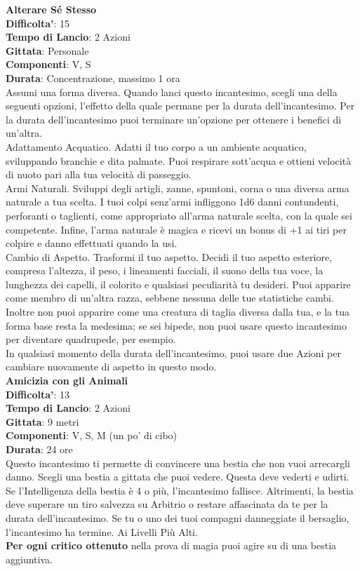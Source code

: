 \begin{multicols}{2}
\medskip\textbf{Alterare Sé Stesso}\\
\textbf{Difficolta'}: 15\\
\textbf{Tempo di Lancio}: 2 Azioni\\
\textbf{Gittata}: Personale\\
\textbf{Componenti}: V, S\\
\textbf{Durata}: Concentrazione, massimo 1 ora\\
Assumi una forma diversa. Quando lanci questo incantesimo, scegli una della seguenti opzioni, l’effetto della quale permane per la durata dell’incantesimo. Per  la durata dell’incantesimo puoi terminare un’opzione per ottenere i benefici di un’altra.\\
Adattamento Acquatico. Adatti il tuo corpo a un ambiente acquatico, sviluppando branchie e dita palmate. Puoi respirare sott’acqua e ottieni velocità di nuoto pari alla tua velocità di passeggio.\\
Armi Naturali. Sviluppi degli artigli, zanne, spuntoni, corna o una diversa arma naturale a tua scelta. I tuoi colpi senz’armi infliggono 1d6 danni contundenti, perforanti o taglienti, come appropriato all’arma naturale scelta, con la quale sei competente. Infine, l’arma naturale è magica e ricevi un bonus di +1 ai tiri per colpire e danno effettuati quando la usi.\\
Cambio di Aspetto. Trasformi il tuo aspetto. Decidi il tuo aspetto esteriore, compresa l’altezza, il peso, i lineamenti facciali, il suono della tua voce, la lunghezza dei capelli, il colorito e qualsiasi peculiarità tu desideri. Puoi apparire come membro di un’altra razza, sebbene nessuna delle tue statistiche cambi. Inoltre non puoi apparire come una creatura di taglia diversa dalla tua, e la tua forma base resta la medesima; se sei bipede, non puoi usare questo incantesimo per diventare quadrupede, per esempio.\\
In qualsiasi momento della durata dell’incantesimo, puoi usare due Azioni per cambiare nuovamente di aspetto in questo modo.\\

\medskip\textbf{Amicizia con gli Animali}\\
\textbf{Difficolta'}: 13\\
\textbf{Tempo di Lancio}: 2 Azioni\\
\textbf{Gittata}: 9 metri\\
\textbf{Componenti}: V, S, M (un po’ di cibo)\\
\textbf{Durata}: 24 ore\\
Questo incantesimo ti permette di convincere una bestia che non vuoi arrecargli danno. Scegli una bestia a gittata che puoi vedere. Questa deve vederti e udirti. Se l’Intelligenza della bestia è 4 o più, l’incantesimo fallisce. Altrimenti, la bestia deve superare un tiro salvezza su Arbitrio o restare affascinata da te per la durata dell’incantesimo. Se tu o uno dei tuoi compagni danneggiate il bersaglio, l’incantesimo ha termine. Ai Livelli Più Alti.\\
\textbf{Per ogni critico ottenuto} nella prova di magia puoi agire su di una bestia aggiuntiva. 


\end{multicols}

